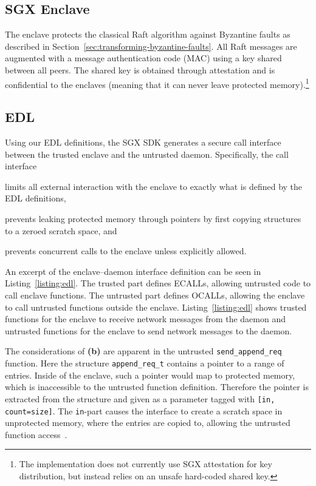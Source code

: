 \documentclass{article}
\begin{document}
	\subsection{SGX Enclave}

	The enclave protects the classical Raft algorithm against Byzantine faults as described in Section~\ref{sec:transforming-byzantine-faults}.
	All Raft messages are augmented with a message authentication code (MAC) using a key shared between all peers.
	The shared key is obtained through attestation and is confidential to the enclaves (meaning that it can never leave protected memory).\footnote{The implementation does not currently use SGX attestation for key distribution, but instead relies on an unsafe hard-coded shared key.}

	\subsection{EDL}

	Using our EDL definitions, the SGX SDK generates a secure call interface between the trusted enclave and the untrusted daemon.
	Specifically, the call interface
	\begin{enumerate*}[label=\textbf{(\alph*)}]
		\item limits all external interaction with the enclave to exactly what is defined by the EDL definitions,
		\item prevents leaking protected memory through pointers by first copying structures to a zeroed scratch space, and
		\item prevents concurrent calls to the enclave unless explicitly allowed.
	\end{enumerate*}

	An excerpt of the enclave--daemon interface definition can be seen in Listing~\ref{listing:edl}.
	The trusted part defines ECALLs, allowing untrusted code to call enclave functions.
	The untrusted part defines OCALLs, allowing the enclave to call untrusted functions outside the enclave.
	Listing~\ref{listing:edl} shows trusted functions for the enclave to receive network messages from the daemon and untrusted functions for the enclave to send network messages to the daemon.

	The considerations of \textbf{(b)} are apparent in the untrusted \texttt{send\_append\_req} function.
	Here the structure \texttt{append\_req\_t} contains a pointer to a range of entries.
	Inside of the enclave, such a pointer would map to protected memory, which is inaccessible to the untrusted function definition.
	Therefore the pointer is extracted from the structure and given as a parameter tagged with \texttt{[in, count=size]}.
	The \texttt{in}-part causes the interface to create a scratch space in unprotected memory, where the entries are copied to, allowing the untrusted function access~\cite{intel_sgx_developer_reference}.
\end{document}
